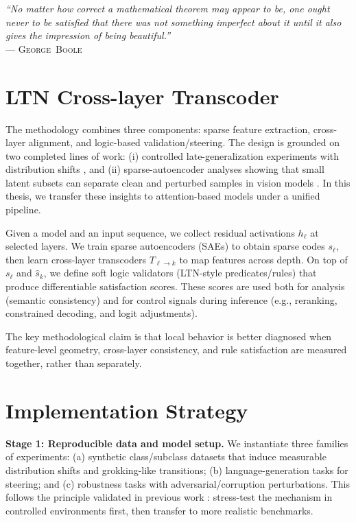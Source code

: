 \documentclass[../ppgc-tese.tex]{subfiles}
\begin{document}
\begin{flushright}
\mbox{}%
{\sffamily\itshape
``No matter how correct a mathematical theorem may appear to be, one ought never to be satisfied that there was not something imperfect about it until it also gives the impression of being beautiful.'' \\}
--- \textsc{George~Boole}
\end{flushright}

\section{LTN Cross-layer Transcoder}
The methodology combines three components: sparse feature extraction, cross-layer alignment, and logic-based validation/steering. The design is grounded on two completed lines of work: (i) controlled late-generalization experiments with distribution shifts \cite{carvalho2025inducing_grokking_distribution_shifts}, and (ii) sparse-autoencoder analyses showing that small latent subsets can separate clean and perturbed samples in vision models \cite{carvalho2026interpretable_stego_detection_sae}. In this thesis, we transfer these insights to attention-based models under a unified pipeline.

Given a model and an input sequence, we collect residual activations $h_\ell$ at selected layers. We train sparse autoencoders (SAEs) to obtain sparse codes $s_\ell$, then learn cross-layer transcoders $T_{\ell\to k}$ to map features across depth. On top of $s_\ell$ and $\hat s_k$, we define soft logic validators (LTN-style predicates/rules) that produce differentiable satisfaction scores. These scores are used both for analysis (semantic consistency) and for control signals during inference (e.g., reranking, constrained decoding, and logit adjustments).

The key methodological claim is that local behavior is better diagnosed when feature-level geometry, cross-layer consistency, and rule satisfaction are measured together, rather than separately.

\section{Implementation Strategy}
\textbf{Stage 1: Reproducible data and model setup.}
We instantiate three families of experiments: (a) synthetic class/subclass datasets that induce measurable distribution shifts and grokking-like transitions; (b) language-generation tasks for steering; and (c) robustness tasks with adversarial/corruption perturbations. This follows the principle validated in previous work \cite{carvalho2025inducing_grokking_distribution_shifts,carvalho2026interpretable_stego_detection_sae}: stress-test the mechanism in controlled environments first, then transfer to more realistic benchmarks.
\end{document}
